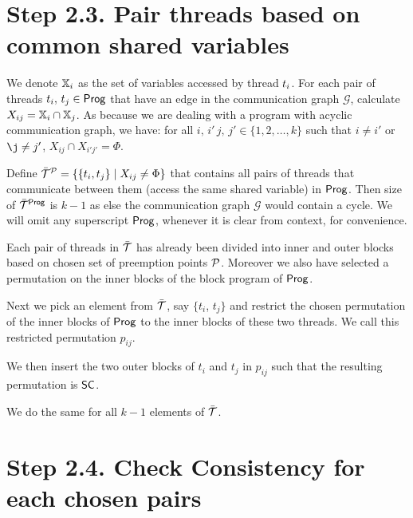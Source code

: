 \section*{Step 2.3. Pair threads based on common shared variables}

We denote ${\mathbb X}_{i}$ as the set of variables accessed by thread $t_i$. 
For each pair of threads $t_i,\, t_j \in \mathsf{Prog}$ that have an edge in the communication graph $\mathcal{G}$,  calculate $X_{ij}={\mathbb X}_i \cap {\mathbb X}_j$. As because we are dealing with a program with acyclic communication graph, we have: for all $i, \, i' \,j, \,j' \in \{1,2,\dots,k\}$ such that $i \neq i'$ or $\j \neq j'$, $X_{ij} \cap X_{i'j'}=\Phi$. 

Define $\bar{{\mathcal T}}^{{\mathcal P}}=\{ \{t_i, t_j\}\mid X_{ij} \neq \Phi \}$ that contains all pairs of threads that communicate between them (access the same shared variable) in $\mathsf{Prog}$. Then size of $\bar{{\mathcal T}}^{\mathsf{Prog}}$ is $k-1$ as else the communication graph $\mathcal{G}$ would contain a cycle. We will omit any  superscript $\mathsf{Prog}$, whenever it is clear from context, for convenience. 

Each pair of threads in $\bar{{\mathcal T}}$ has already been divided into inner and outer blocks based on chosen set of preemption points $\mathcal{P}$. Moreover we also have selected a permutation on the inner blocks of the block program of $\mathsf{Prog}$. 

Next we pick an element from $\bar{{\mathcal T}}$, say $\{t_i$, $t_j\}$ and restrict the chosen  permutation of the inner blocks of $\mathsf{Prog}$ to the inner  blocks of these two threads. We call this restricted permutation $p_{ij}$.


We then insert the two outer blocks of $t_i$ and $t_j$ in $p_{ij}$ such that the resulting permutation is $\mathsf{SC}$. 

We do the same for all $k-1$ elements of $\bar{{\mathcal T}}$.

\section*{Step 2.4. Check Consistency for each chosen pairs}

